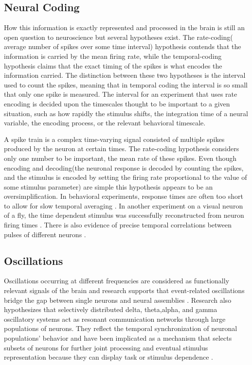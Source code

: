 \documentclass{report}
\begin{document}
\subsection{Neural Coding}
How this information is exactly represented and processed in the brain is still an open question to neuroscience but several hypotheses exist. The rate-coding( average number of spikes over some time interval) hypothesis \cite{ Salzman1992} \cite{Tovee1993} contends that the information is carried by the mean firing rate, while the temporal-coding   hypothesis \cite{Bair1996} \cite{buracas1998} \cite{Rucci2018} claims that the exact timing of the spikes is what encodes the information carried.
The distinction between these two hypotheses is the interval used to count the spikes, meaning that in temporal coding the interval is so small that only one spike is measured. The interval for an experiment that uses rate encoding is decided upon the timescales thought to be important to a given situation, such as how rapidly the stimulus shifts, the integration time of a neural variable, the encoding process, or the relevant behavioral timescale. 


A spike train is a complex time-varying signal consisted of multiple spikes produced by the neuron at certain times. The rate-coding hypothesis considers only one number to be important, the mean rate of these spikes. Even though encoding and decoding(the neuronal response is decoded by counting the spikes, and the stimulus is encoded by setting the firing rate proportional to the value of some stimulus parameter) are simple this hypothesis appears to be an oversimplification. In behavioral experiments, response times are often too short to allow for slow temporal averaging \cite{thorpe1996}. In another experiment on a visual neuron of a fly, the time dependent stimulus was successfully reconstructed from neuron firing times \cite{Bialek1991}. There is also evidence of precise temporal correlations between pulses of different neurons \cite{Lestienne1996} .

\subsection{Oscillations}
Oscillations occurring at different frequencies are considered as functionally relevant signals of the brain and research supports that event-related oscillations bridge the gap between single neurons and neural assemblies \cite{Basar2000}. Research also hypothesizes that selectively  distributed delta, theta,alpha, and gamma oscillatory systems act as resonant communication networks through large populations of neurons. They reflect the temporal synchronization of neuronal populations' behavior and have been implicated as a mechanism that selects subsets of neurons for further joint processing and eventual stimulus representation because they can display task or stimulus dependence \cite{Singer1995} \cite{Singer1999}.






\end{document}
